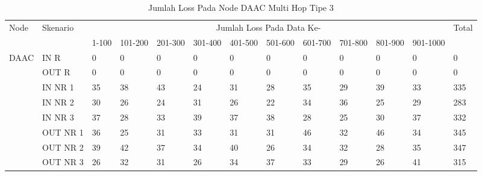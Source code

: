 \begin{table}[H]
  \centering
  \caption{Jumlah Loss Pada Node DAAC Multi Hop Tipe 3}
    \begin{tabular}{|p{1cm}|p{1.9cm}|p{0.6cm}|p{0.6cm}|p{0.6cm}|p{0.6cm}|p{0.6cm}|p{0.6cm}|p{0.6cm}|p{0.6cm}|p{0.6cm}|p{0.6cm}|p{1cm}|}
    \hline
        \multirow{2}{*}{Node}&\multirow{2}{*}{Skenario}&\multicolumn{10}{|c|}{Jumlah Loss Pada Data Ke-}&\multirow{2}{*}{Total} \\\cline{3-12}
          & & 1-100 & 101-200 & 201-300 & 301-400 & 401-500 & 501-600 & 601-700 & 701-800 & 801-900 & 901-1000 & \\
        \hline
    \multirow{8}{*}{DAAC}  
    & IN R  & 0     & 0     & 0     & 0     & 0     & 0     & 0     & 0     & 0     & 0     & 0 \\
          & OUT R & 0     & 0     & 0     & 0     & 0     & 0     & 0     & 0     & 0     & 0     & 0 \\
          & IN NR 1 & 35    & 38    & 43    & 24    & 31    & 28    & 35    & 29    & 39    & 33    & 335 \\
          & IN NR 2 & 30    & 26    & 24    & 31    & 26    & 22    & 34    & 36    & 25    & 29    & 283 \\
          & IN NR 3 & 37    & 28    & 33    & 39    & 37    & 38    & 28    & 25    & 30    & 37    & 332 \\
          & OUT NR 1 & 36    & 25    & 31    & 33    & 31    & 31    & 46    & 32    & 46    & 34    & 345 \\
          & OUT NR 2 & 39    & 42    & 37    & 34    & 40    & 26    & 34    & 32    & 28    & 35    & 347 \\
          & OUT NR 3 & 26    & 32    & 31    & 26    & 34    & 37    & 33    & 29    & 26    & 41    & 315 \\
    \hline
    \end{tabular}%
  \label{tab:addlabel}%
\end{table}%
